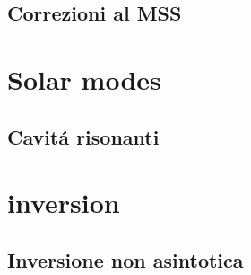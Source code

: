 \documentclass[oneside,12pt,fleqn]{memoir}%
\begin{document}
\section{Correzioni al MSS}

%



\chapter{Solar modes}

\section{Cavit\'a risonanti}

%


\chapter{inversion}

\section{Inversione non asintotica}

%

\clearpage
{}
\printindex
\end{document}

